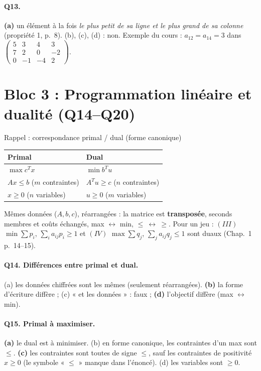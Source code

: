 \documentclass[11pt,a4paper]{article}
\newcommand{\bon}[1]{\textcolor{green!50!black}{\textbf{#1}}}
\newcommand{\faux}[1]{\textcolor{red!70!black}{#1}}
\begin{document}
\paragraph{Q13.} \bon{(a)} un élément à la fois \emph{le plus petit de sa ligne et le plus grand de sa colonne} (propriété 1, p.~8). \faux{(b)}, \faux{(c)}, \faux{(d)} : non. Exemple du cours : $a_{12}=a_{14}=3$ dans $\begin{pmatrix}5&3&4&3\\7&2&0&-2\\0&-1&-4&2\end{pmatrix}$.

\section*{Bloc 3 : Programmation linéaire et dualité (Q14--Q20)}

\begin{propbox}{Rappel : correspondance primal / dual (forme canonique)}
\centering
\begin{tabular}{l|l}
Primal & Dual\\\hline
$\max c^Tx$ & $\min b^Tu$\\
$Ax\le b$ ($m$ contraintes) & $A^Tu\ge c$ ($n$ contraintes)\\
$x\ge0$ ($n$ variables) & $u\ge0$ ($m$ variables)
\end{tabular}

\raggedright
Mêmes données ($A,b,c$), réarrangées : la matrice est \textbf{transposée}, seconds membres et coûts échangés, max $\leftrightarrow$ min, $\le\ \leftrightarrow\ \ge$. Pour un jeu : $(III)$ $\min\sum p_i$, $\sum_ia_{ij}p_i\ge1$ et $(IV)$ $\max\sum q_j$, $\sum_ja_{ij}q_j\le1$ sont duaux (Chap.~1 p.~14--15).
\end{propbox}

\paragraph{Q14. Différences entre primal et dual.}
\faux{(a)} les données chiffrées sont les mêmes (seulement réarrangées). \bon{(b)} la forme d'écriture diffère ; \faux{(c)} « et les données » : faux ; \bon{(d)} l'objectif diffère (max $\leftrightarrow$ min).

\paragraph{Q15. Primal à maximiser.}
\bon{(a)} le dual est à minimiser. \faux{(b)} en forme canonique, les contraintes d'un max sont $\le$. \bon{(c)} les contraintes sont toutes de signe $\le$, sauf les contraintes de positivité $x\ge0$ (le symbole « $\le$ » manque dans l'énoncé). \faux{(d)} les variables sont $\ge0$.
\end{document}
